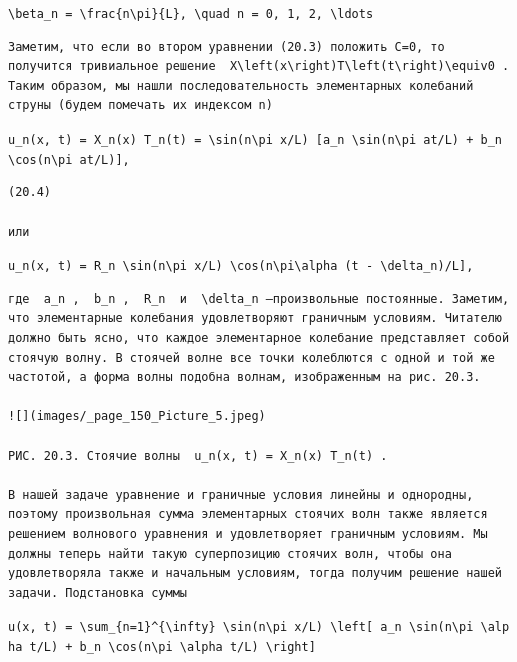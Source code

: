 \documentclass[
  ukrainian,
]{article}
\begin{document}
\texttt{\textbackslash{}beta\_n\ =\ \textbackslash{}frac\{n\textbackslash{}pi\}\{L\},\ \textbackslash{}quad\ n\ =\ 0,\ 1,\ 2,\ \textbackslash{}ldots}

\begin{verbatim}
Заметим, что если во втором уравнении (20.3) положить C=0, то получится тривиальное решение  X\left(x\right)T\left(t\right)\equiv0 . Таким образом, мы нашли последовательность элементарных колебаний струны (будем помечать их индексом n)
\end{verbatim}

\texttt{u\_n(x,\ t)\ =\ X\_n(x)\ T\_n(t)\ =\ \textbackslash{}sin(n\textbackslash{}pi\ x/L)\ {[}a\_n\ \textbackslash{}sin(n\textbackslash{}pi\ at/L)\ +\ b\_n\ \textbackslash{}cos(n\textbackslash{}pi\ at/L){]},}

\begin{verbatim}
(20.4)

или
\end{verbatim}

\texttt{u\_n(x,\ t)\ =\ R\_n\ \textbackslash{}sin(n\textbackslash{}pi\ x/L)\ \textbackslash{}cos(n\textbackslash{}pi\textbackslash{}alpha\ (t\ -\ \textbackslash{}delta\_n)/L{]},}

\begin{verbatim}
где  a_n ,  b_n ,  R_n  и  \delta_n —произвольные постоянные. Заметим, что элементарные колебания удовлетворяют граничным условиям. Читателю должно быть ясно, что каждое элементарное колебание представляет собой стоячую волну. В стоячей волне все точки колеблются с одной и той же частотой, а форма волны подобна волнам, изображенным на рис. 20.3.

![](images/_page_150_Picture_5.jpeg)

РИС. 20.3. Стоячие волны  u_n(x, t) = X_n(x) T_n(t) .

В нашей задаче уравнение и граничные условия линейны и однородны, поэтому произвольная сумма элементарных стоячих волн также является решением волнового уравнения и удовлетворяет граничным условиям. Мы должны теперь найти такую суперпозицию стоячих волн, чтобы она удовлетворяла также и начальным условиям, тогда получим решение нашей задачи. Подстановка суммы
\end{verbatim}

\texttt{u(x,\ t)\ =\ \textbackslash{}sum\_\{n=1\}\^{}\{\textbackslash{}infty\}\ \textbackslash{}sin(n\textbackslash{}pi\ x/L)\ \textbackslash{}left{[}\ a\_n\ \textbackslash{}sin(n\textbackslash{}pi\ \textbackslash{}alpha\ t/L)\ +\ b\_n\ \textbackslash{}cos(n\textbackslash{}pi\ \textbackslash{}alpha\ t/L)\ \textbackslash{}right{]}}
\end{document}
